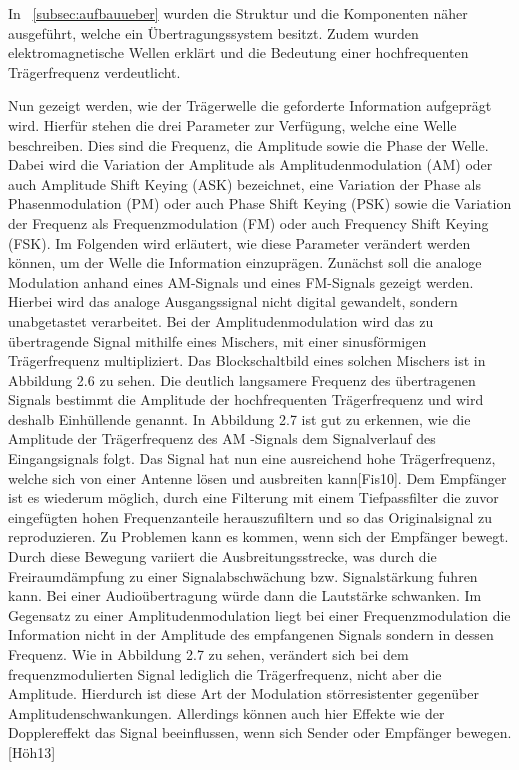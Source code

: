 In ~\ref{subsec:aufbauueber} wurden die Struktur und die Komponenten näher ausgeführt, welche ein Übertragungssystem besitzt. Zudem wurden elektromagnetische Wellen erklärt und die Bedeutung einer hochfrequenten Trägerfrequenz verdeutlicht. 


Nun gezeigt werden, wie der Trägerwelle die geforderte Information aufgeprägt wird. Hierfür stehen die drei Parameter zur Verfügung, welche eine Welle beschreiben. Dies sind die Frequenz, die Amplitude sowie die Phase der Welle. Dabei wird die Variation der Amplitude als Amplitudenmodulation (AM) oder auch Amplitude Shift Keying (ASK) bezeichnet, eine Variation der Phase als Phasenmodulation
(PM) oder auch Phase Shift Keying (PSK) sowie die Variation der Frequenz als Frequenzmodulation (FM) oder auch Frequency Shift Keying (FSK). Im Folgenden wird erläutert,
wie diese Parameter verändert werden können, um der Welle die Information einzuprägen.
Zunächst soll die analoge Modulation anhand eines AM-Signals und eines FM-Signals gezeigt werden. Hierbei wird das analoge Ausgangssignal nicht digital gewandelt, sondern
unabgetastet verarbeitet. Bei der Amplitudenmodulation wird das zu übertragende Signal mithilfe eines Mischers, mit einer sinusförmigen Trägerfrequenz multipliziert. Das Blockschaltbild eines solchen Mischers ist in Abbildung 2.6 zu sehen.
Die deutlich langsamere Frequenz des übertragenen Signals bestimmt die Amplitude der hochfrequenten Trägerfrequenz und wird deshalb Einhüllende genannt. In Abbildung 2.7 ist gut zu erkennen, wie die Amplitude der Trägerfrequenz des AM -Signals dem Signalverlauf des Eingangsignals folgt. Das Signal hat nun eine ausreichend hohe Trägerfrequenz, welche sich von einer Antenne lösen und ausbreiten kann[Fis10]. Dem Empfänger ist es wiederum möglich, durch eine Filterung mit einem Tiefpassfilter die zuvor eingefügten hohen Frequenzanteile herauszufiltern und so das Originalsignal zu reproduzieren. Zu Problemen kann es kommen, wenn sich der Empfänger bewegt. Durch diese Bewegung variiert
die Ausbreitungsstrecke, was durch die Freiraumdämpfung zu einer Signalabschwächung
bzw. Signalstärkung fuhren kann. Bei einer Audioübertragung würde dann die Lautstärke schwanken. Im Gegensatz zu einer Amplitudenmodulation liegt bei einer Frequenzmodulation die Information nicht in der Amplitude des empfangenen Signals sondern in dessen Frequenz. Wie in Abbildung 2.7 zu sehen, verändert sich bei dem frequenzmodulierten Signal lediglich die Trägerfrequenz, nicht aber die Amplitude. Hierdurch ist diese Art der Modulation störresistenter gegenüber Amplitudenschwankungen. Allerdings können auch hier Effekte wie der Dopplereffekt das Signal beeinflussen, wenn sich Sender oder Empfänger bewegen.[Höh13]


